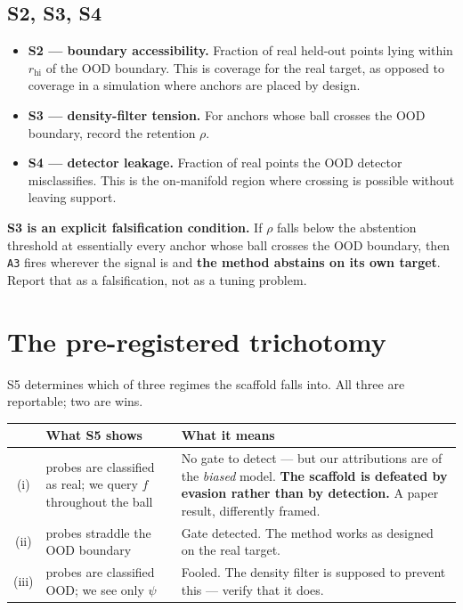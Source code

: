 \documentclass[11pt]{article}
\begin{document}
\subsection*{S2, S3, S4}

\begin{itemize}
\item \textbf{S2 --- boundary accessibility.} Fraction of real held-out points lying within
$r_{\text{hi}}$ of the OOD boundary. This is coverage for the real target, as opposed to
coverage in a simulation where anchors are placed by design.
\item \textbf{S3 --- density-filter tension.} For anchors whose ball crosses the OOD boundary,
record the retention $\rho$.
\item \textbf{S4 --- detector leakage.} Fraction of real points the OOD detector misclassifies.
This is the on-manifold region where crossing is possible without leaving support.
\end{itemize}

\begin{limitbox}
\noindent\textbf{S3 is an explicit falsification condition.} If $\rho$ falls below the abstention
threshold at essentially every anchor whose ball crosses the OOD boundary, then \texttt{A3} fires
wherever the signal is and \textbf{the method abstains on its own target}. Report that as a
falsification, not as a tuning problem.
\end{limitbox}

\section{The pre-registered trichotomy}

S5 determines which of three regimes the scaffold falls into. All three are reportable; two are
wins.

\begin{table}[h]
\small
\begin{tabular}{@{}cp{}p{}@{}}
\toprule
& \textbf{\sffamily What S5 shows} & \textbf{\sffamily What it means}\\
\midrule
(i) & probes are classified as real; we query $f$ throughout the ball
    & No gate to detect --- but our attributions are of the \emph{biased} model.
      \textbf{The scaffold is defeated by evasion rather than by detection.} A paper result,
      differently framed.\\
(ii) & probes straddle the OOD boundary
    & Gate detected. The method works as designed on the real target.\\
(iii) & probes are classified OOD; we see only $\psi$
    & Fooled. The density filter is supposed to prevent this --- verify that it does.\\
\bottomrule
\end{tabular}
\end{table}
\end{document}
